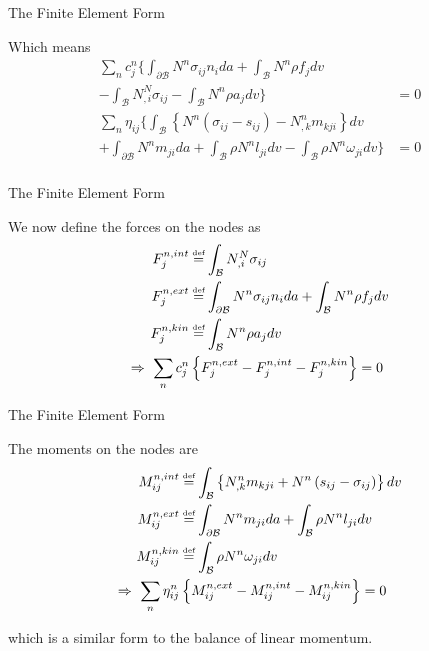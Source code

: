 \documentclass[11pt]{beamer}
\newcommand\defeq{\mathrel{\stackrel{\makebox[0pt]{\mbox{\normalfont\tiny def}}}{=}}}
\begin{document}
\begin{frame}{The Finite Element Form}

Which means
\begin{align*}
\sum_{n} c_j^n \bigg\{\int_{\partial \mathcal{B}} N^n \sigma_{ij} n_i da +\int_{\mathcal{B}} N^n \rho f_j dv &\\- \int_{\mathcal{B}}N_{,i}^N \sigma_{ij}
- \int_{\mathcal{B}} N^n \rho a_j  dv\bigg\} &= 0\\
\sum_{n} \eta_{ij} \bigg\{\int_{\mathcal{B}} \left\{N^n \left(\sigma_{ij} - s_{ij}\right) - N_{,k}^n m_{kji} \right\}dv\\
+ \int_{\partial \mathcal{B}} N^n m_{ji}  da + \int_{\mathcal{B}} \rho N^n l_{ji}dv - \int_{\mathcal{B}} \rho N^n \omega_{ji} dv\bigg\}&= 0\\
\end{align*}

\end{frame}

\begin{frame}{The Finite Element Form}

We now define the forces on the nodes as
\begin{align*}
F_{j}^{n,int} &\defeq \int_{\mathcal{B}}N_{,i}^N \sigma_{ij}\\
F_{j}^{n,ext} &\defeq \int_{\partial \mathcal{B}} N^n \sigma_{ij} n_i da +\int_{\mathcal{B}} N^n \rho f_j dv\\
F_{j}^{n,kin} &\defeq \int_{\mathcal{B}} N^n \rho a_j  dv\\
\Rightarrow\ \sum_{n} c_j^n &\left\{F_{j}^{n,ext} - F_{j}^{n,int} - F_{j}^{n,kin} \right\} = 0\\
\end{align*}

\end{frame}

\begin{frame}{The Finite Element Form}

The moments on the nodes are
\begin{align*}
M_{ij}^{n,int} &\defeq \int_{\mathcal{B}} \left\{N_{,k}^n m_{kji} + N^n \left(s_{ij} - \sigma_{ij}\right)\right\}dv\\
M_{ij}^{n,ext} &\defeq \int_{\partial \mathcal{B}} N^n m_{ji}  da + \int_{\mathcal{B}} \rho N^n l_{ji}dv\\
M_{ij}^{n,kin} &\defeq \int_{\mathcal{B}} \rho N^n \omega_{ji} dv\\
\Rightarrow\ \sum_{n} \eta_{ij}^n &\left\{M_{ij}^{n,ext} - M_{ij}^{n,int} - M_{ij}^{n,kin} \right\} = 0\\
\end{align*}

which is a similar form to the balance of linear momentum.

\end{frame}
\end{document}
